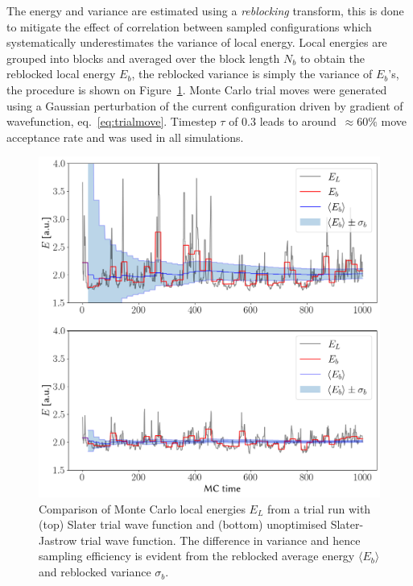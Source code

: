 \documentclass[final,3p,times,twocolumn]{elsarticle}
\begin{document}
	The energy and variance are estimated using a \emph{reblocking} transform, this is done to mitigate the effect of correlation between sampled configurations which systematically underestimates the variance of local energy. Local energies are grouped into blocks and averaged over the block length $N_b$ to obtain the reblocked local energy $E_b$, the reblocked variance is simply the variance of $E_b$'s, the procedure is shown on Figure~\ref{fig:blocking+jast}. 
	Monte Carlo trial moves were generated using a Gaussian perturbation of the current configuration driven by gradient of wavefunction, eq.~\eqref{eq:trialmove}. Timestep $\tau$ of $0.3$ leads to around~$\approx 60\%$ move acceptance rate and was used in all simulations.
	\begin{figure}
	\centering
	\includegraphics[width=\linewidth]{../plots/blocking.png}
	\caption{Comparison of Monte Carlo local energies $E_L$ from a trial run with (top) Slater trial wave function and (bottom) unoptimised Slater-Jastrow trial wave function. The difference in variance and hence sampling efficiency is evident from the reblocked average energy $\langle E_b \rangle$ and reblocked variance $\sigma_b$.}
	\label{fig:blocking+jast}
	\end{figure}
\end{document}
